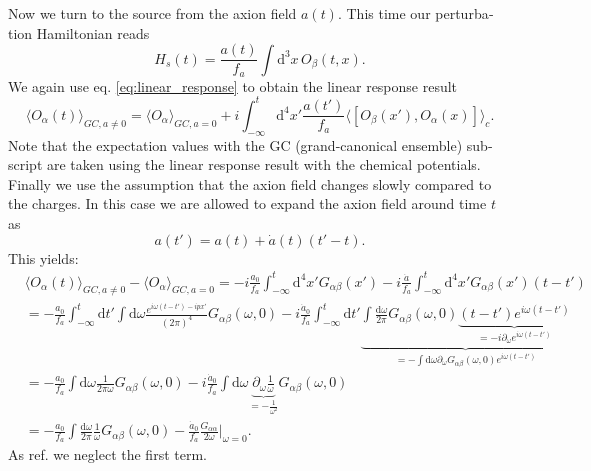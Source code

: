 \documentclass[master,       %
               twoside,        %
               BCOR10mm,       %
               english,ngerman, %
               ]{GAUBM}
\begin{document}
\begin{otherlanguage}{english}
Now we turn to the source from the axion field $a(t)$.
This time our perturbation Hamiltonian reads
\begin{equation}
	H_s(t) = \frac{a(t)}{f_a} \int \mathrm{d}^3 x \, O_\beta(t, x).
\end{equation}
We again use eq. \eqref{eq:linear_response} to obtain the linear response result
\begin{equation}
	\langle O_\alpha(t) \rangle_{GC, a \ne 0} = \langle O_\alpha \rangle_{GC, a = 0} + i \int_{-\infty}^t \mathrm{d}^4 x' \frac{a(t')}{f_a} \langle [ O_\beta(x'), O_\alpha(x)] \rangle_c.
\end{equation}
Note that the expectation values with the GC (grand-canonical ensemble) subscript are taken using the linear response result with the chemical potentials.
Finally we use the assumption that the axion field changes slowly compared to the charges. In this case we are allowed to expand the axion field
around time $t$ as
\begin{equation}
	a(t') = a(t) + \dot{a}(t)(t' - t).
\end{equation}
This yields:
\begin{align}
	 &\langle O_\alpha(t) \rangle_{GC, a \ne 0} - \langle O_\alpha  \rangle_{GC, a = 0} = - i \frac{a_0}{f_a} \int_{-\infty}^t \mathrm{d}^4 x' G_{\alpha \beta}(x') - i \frac{\dot{a}}{f_a} \int_{-\infty}^t \mathrm{d}^4 x' G_{\alpha \beta}(x') (t - t')
	 \nonumber \\ 
	 &= - \frac{a_0}{f_a} \int_{-\infty}^t \mathrm{d} t' \int \mathrm{d} \omega \frac{e^{i \omega (t - t') - i p x'}}{(2\pi)^4} G_{\alpha \beta}(\omega, 0)
	 -i \frac{\dot{a}_0}{f_a} \int_{-\infty}^t \mathrm{d} t' \underbrace{\int \frac{\mathrm{d} \omega}{2 \pi} G_{\alpha \beta}(\omega, 0) \underbrace{(t - t') e^{i \omega (t - t')}}_{= -i \partial_\omega e^{i \omega (t - t')}}}_{= - \int \mathrm{d} \omega \partial_\omega G_{\alpha \beta}(\omega, 0) e^{i \omega (t - t')}}
	 \nonumber \\
	 &= - \frac{a_0}{f_a} \int \mathrm{d} \omega \frac{1}{2 \pi \omega} G_{\alpha \beta}(\omega, 0) - i \frac{\dot{a}_0}{f_a} \int \mathrm{d} \omega \underbrace{\partial_\omega \frac{1}{\omega}}_{= - \frac{1}{\omega^2}} G_{\alpha \beta}(\omega, 0) \nonumber \\
	 &= - \frac{a_0}{f_a} \int \frac{\mathrm{d} \omega}{2 \pi} \frac{1}{\omega} G_{\alpha \beta}(\omega, 0) - \frac{\dot{a}_0}{f_a} \frac{G_{\alpha \alpha}}{2 \omega} \Big|_{\omega = 0}.
	 \label{eq:axion_source_term_linear_response}
\end{align}
As ref. \cite{Domcke:2020kcp_Generic_Couplings} we neglect the first term.


\end{otherlanguage}
\end{document}
